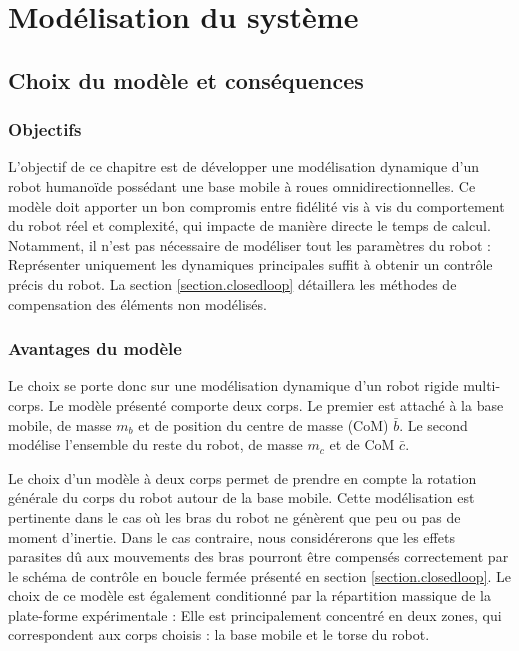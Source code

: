 \chapter{Modélisation du système}
\section{Choix du modèle et conséquences}
	\subsection{Objectifs}
		L'objectif de ce chapitre est de développer une modélisation dynamique d'un robot humanoïde possédant une base mobile à roues omnidirectionnelles. 
		Ce modèle doit apporter un bon compromis entre fidélité vis à vis du comportement du robot réel et complexité, qui impacte de manière directe le temps de calcul.
		Notamment, il n'est pas nécessaire de modéliser tout les paramètres du robot : Représenter uniquement les dynamiques principales suffit à obtenir un contrôle précis du robot. 
		La section \ref{section.closedloop} détaillera les méthodes de compensation des éléments non modélisés.
	
		
	\subsection{Avantages du modèle}
		
		Le choix se porte donc sur une modélisation dynamique d'un robot rigide multi-corps. 
		Le modèle présenté  comporte deux corps. Le premier est attaché à la base mobile, de masse $m_b$ et de position du centre de masse (CoM) $\bar{b}$.
		Le second modélise l'ensemble du reste du robot, de masse $m_c$ et de CoM $\bar{c}$.
		
		Le choix d'un modèle à deux corps permet de prendre en compte la rotation générale du corps du robot autour de la base mobile.
		Cette modélisation est pertinente dans le cas où les bras du robot ne génèrent que peu ou pas de moment d'inertie.
		Dans le cas contraire, nous considérerons que les effets parasites dû aux mouvements des bras pourront être compensés correctement par le schéma de contrôle en boucle fermée présenté en section \ref{section.closedloop}.
		Le choix de ce modèle est également conditionné par la répartition massique de la plate-forme expérimentale :
		Elle est principalement concentré en deux zones, qui correspondent aux corps choisis : la base mobile et le torse du robot.	
	
